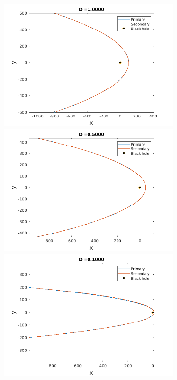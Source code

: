 \documentclass[a4paper]{article}
\begin{document}
\begin{enumerate} [label*=\textbf{(\alph*)}]
				\begin{figure} [h]
					\centering
					\begin{subfigure} {.425\linewidth}
						\includegraphics[width=\linewidth, height =.55\linewidth] {../plots/3f/retrograde_orbits/6.png}\\
						\includegraphics[width=\linewidth, height =.55\linewidth] {../plots/3f/retrograde_orbits/5.png}\\
						\includegraphics[width=\linewidth, height =.55\linewidth] {../plots/3f/retrograde_orbits/4.png}\\

\end{subfigure}
\end{figure}
\end{enumerate}
\end{document}
